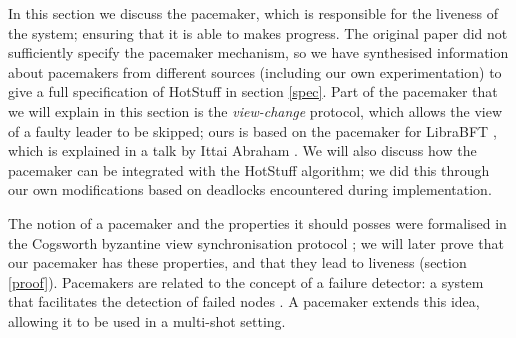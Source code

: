 In this section we discuss the pacemaker, which is responsible for the liveness of the system; ensuring that it is able to makes progress. The original paper did not sufficiently specify the pacemaker mechanism, so we have synthesised information about pacemakers from different sources (including our own experimentation) to give a full specification of HotStuff in section \ref{spec}. Part of the pacemaker that we will explain in this section is the \textit{view-change} protocol, which allows the view of a faulty leader to be skipped; ours is based on the pacemaker for LibraBFT \cite{baudetStateMachineReplication2019}, which is explained in a talk by Ittai Abraham \cite{ittai}. We will also discuss how the pacemaker can be integrated with the HotStuff algorithm; we did this through our own modifications based on deadlocks encountered during implementation.


The notion of a pacemaker and the properties it should posses were formalised in the Cogsworth byzantine view synchronisation protocol \cite{naorCogsworthByzantineView2021}; we will later prove that our pacemaker has these properties, and that they lead to liveness (section \ref{proof}). Pacemakers are related to the concept of a failure detector: a system that facilitates the detection of failed nodes \cite{chandraWeakestFailureDetector1996,chandraUnreliableFailureDetectors1996}. A pacemaker extends this idea, allowing it to be used in a multi-shot setting.


